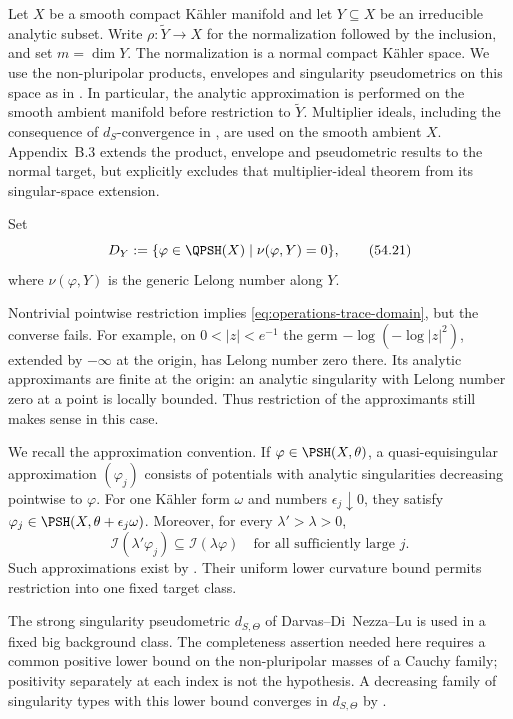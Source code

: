Let $X$ be a smooth compact K\"ahler manifold and let $Y\subseteq X$
be an irreducible analytic subset.  Write
$\rho:\widetilde Y\to X$ for the normalization followed by the inclusion,
and set $m=\dim Y$.  The normalization is a normal compact K\"ahler
space.  We use the non-pluripolar products, envelopes and singularity
pseudometrics on this space as in
\cite[Section~8.1 and Appendix~B.3]{XiaBook}.
In particular, the analytic approximation is performed on the smooth
ambient manifold before restriction to $\widetilde Y$.
Multiplier ideals, including the consequence of $d_S$-convergence in
\cite[Theorem~6.2.6]{XiaBook}, are used on the smooth ambient $X$.
Appendix~B.3 extends the product, envelope and pseudometric results
to the normal target, but explicitly excludes that multiplier-ideal
theorem from its singular-space extension.

\begin{definition}
\label{def:operations-trace-domain}
Set
\[
 D_Y
 :=\{\varphi\in\QPSH(X)\mid\nu(\varphi,Y)=0\},
\tag{54.21}\label{eq:operations-trace-domain}
\]
where $\nu(\varphi,Y)$ is the generic Lelong number along $Y$.
\end{definition}

Nontrivial pointwise restriction implies
\eqref{eq:operations-trace-domain}, but the converse fails.
For example, on $0<|z|<e^{-1}$ the germ $-\log(-\log|z|^2)$,
extended by $-\infty$ at the origin, has Lelong number zero there.
Its analytic approximants
are finite at the origin: an analytic singularity with Lelong number
zero at a point is locally bounded.  Thus restriction of the
approximants still makes sense in this case.

We recall the approximation convention.  If
$\varphi\in\PSH(X,\theta)$, a quasi-equisingular approximation
$(\varphi_j)$ consists of potentials with analytic singularities
decreasing pointwise to $\varphi$.  For one K\"ahler form $\omega$
and numbers $\epsilon_j\downarrow0$, they satisfy
$\varphi_j\in\PSH(X,\theta+\epsilon_j\omega)$.
Moreover, for every $\lambda'>\lambda>0$,
\[
 \mathcal I(\lambda'\varphi_j)\subseteq\mathcal I(\lambda\varphi)
 \quad\text{for all sufficiently large }j.
\tag{54.21a}\label{eq:operations-trace-qe}
\]
Such approximations exist by
\cite[Definition~1.6.4 and Theorem~1.6.2]{XiaBook}.
Their uniform lower curvature bound permits restriction into one
fixed target class.

The strong singularity pseudometric $d_{S,\Theta}$ of
Darvas--Di~Nezza--Lu is used in a fixed big background class.
The completeness assertion needed here requires a common positive
lower bound on the non-pluripolar masses of a Cauchy family;
positivity separately at each index is not the hypothesis.
A decreasing family of singularity types with this lower bound
converges in $d_{S,\Theta}$ by
\cite[Corollary~6.2.7]{XiaBook}.

